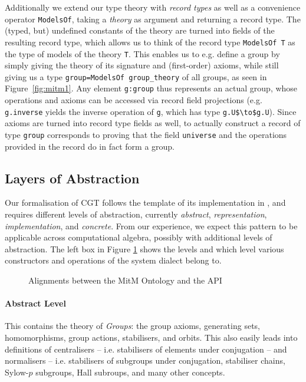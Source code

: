 Additionally we extend our type theory with \emph{record types} as well as a
convenience operator \lstinline|ModelsOf|, taking a \emph{theory} as argument
and returning a record type. The (typed, but) undefined constants of the theory
are turned into fields of the resulting record type, which allows us to think of
the record type \lstinline|ModelsOf T| as the type of models of the theory
\lstinline|T|. This enables us to e.g. define a group by simply giving the
theory of its signature and (first-order) axioms, while still giving us a type
\lstinline|group=ModelsOf group_theory| of all groups, as seen in
Figure~\ref{fig:mitm1}. Any element \lstinline|g:group| thus represents an
actual group, whose operations and axioms can be accessed via record field
projections (e.g. \lstinline|g.inverse| yields the inverse operation of
\lstinline|g|, which has type \lstinline[mathescape]|g.U$\to$g.U|). Since axioms
are turned into record type fields as well, to actually construct a record of
type \lstinline|group| corresponds to proving that the field
\lstinline|universe| and the operations provided in the record do in fact form a
group.


\subsection{Layers of Abstraction}

Our formalisation of CGT follows the template of its implementation in \GAP, and
requires different levels of abstraction, currently \emph{abstract},
\emph{representation}, \emph{implementation}, and \emph{concrete}. From our
experience, we expect this pattern to be applicable across computational
algebra, possibly with additional levels of abstraction. The left box in Figure
\ref{fig:cgtontology} shows the levels and which level various constructors and
operations of the \GAP system dialect belong to.

\begin{figure}[ht]\centering
  \caption{Alignments between the MitM Ontology and the \GAP API}\label{fig:cgtontology}
\end{figure}

\paragraph{Abstract Level} This contains the theory of \emph{Groups}: the group
axioms, generating sets, homomorphisms, group actions, stabilisers, and orbits.
This also easily leads into definitions of centralisers -- i.e. stabilisers of
elements under conjugation -- and normalisers -- i.e. stabilisers of subgroups
under conjugation, stabiliser chains, Sylow-$p$ subgroups, Hall subroups, and
many other concepts.

